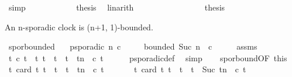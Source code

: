 \begin{isabellebody}
\ simp\isanewline
\ \ \ \ \ \ \ \ \ \ \isamarkupfalse%
\ {\isacharquery}thesis\ \isamarkupfalse%
\ linarith\isanewline
\ \ \ \ \ \ \isamarkupfalse%
\isanewline
\ \ \ \ \isamarkupfalse%
\isanewline
\ \ \isacommand{{\isacharbraceright}}\isamarkupfalse%
\ \isamarkupfalse%
\ {\isacharquery}thesis\ \isacommand{{\isachardot}{\isachardot}}\isamarkupfalse%
\isanewline
{}\isamarkupfalse%
%
\endisatagproof
{\isafoldproof}%
%
\isadelimproof
%
\endisadelimproof
%
\begin{isamarkuptext}%
An n-sporadic clock is (n+1, 1)-bounded.%
\end{isamarkuptext}\isamarkuptrue%
\isamarkupfalse%
\ spor{\isacharunderscore}bounded{\isacharcolon}\isanewline
\ \ \ {\isacartoucheopen}p{\isacharunderscore}sporadic\ n\ c{\isacartoucheclose}\isanewline
\ \ \ \ \ {\isacartoucheopen}bounded\ {\isacharparenleft}Suc\ n{\isacharparenright}\ {}\ c{\isacartoucheclose}\isanewline
%
\isadelimproof
%
\endisadelimproof
%
\isatagproof
{}\isamarkupfalse%
\ {\isacharminus}\isanewline
\ \ \isamarkupfalse%
\ assms\ \isamarkupfalse%
\ {\isacartoucheopen}{\isasymforall}t{\isachardot}\ c\ t\ {\isasymlongrightarrow}\ {\isacharparenleft}{\isasymforall}t{\isacharprime}{\isachardot}\ {\isacharparenleft}t\ {\isacharless}\ t{\isacharprime}\ {\isasymand}\ t{\isacharprime}\ {\isasymle}\ t{\isacharplus}n{\isacharparenright}\ {\isasymlongrightarrow}\ {\isasymnot}{\isacharparenleft}c\ t{\isacharprime}{\isacharparenright}{\isacharparenright}{\isacartoucheclose}\isanewline
\ \ \ \ \isamarkupfalse%
\ p{\isacharunderscore}sporadic{\isacharunderscore}def\ \isamarkupfalse%
\ simp\isanewline
\ \ \isamarkupfalse%
\ spor{\isacharunderscore}bound{\isacharbrackleft}OF\ this{\isacharbrackright}\ \isamarkupfalse%
\ {\isacartoucheopen}{\isasymforall}t{\isachardot}\ card\ {\isacharbraceleft}t{\isacharprime}{\isachardot}\ t\ {\isasymle}\ t{\isacharprime}\ {\isasymand}\ t{\isacharprime}\ {\isasymle}\ t{\isacharplus}n\ {\isasymand}\ c\ t{\isacharprime}{\isacharbraceright}\ {\isasymle}\ {}{\isacartoucheclose}\ \isacommand{{\isachardot}}\isamarkupfalse%
\isanewline
\ \ \isamarkupfalse%
\ {\isacartoucheopen}{\isasymforall}t{\isachardot}\ card\ {\isacharbraceleft}t{\isacharprime}{\isachardot}\ t\ {\isasymle}\ t{\isacharprime}\ {\isasymand}\ t{\isacharprime}\ {\isacharless}\ Suc\ {\isacharparenleft}t{\isacharplus}n{\isacharparenright}\ {\isasymand}\ c\ t{\isacharprime}{\isacharbraceright}\ {\isasymle}\ {}{\isacartoucheclose}\isanewline

\end{isabellebody}
